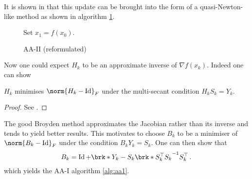 %


It is shown in \cite{ZhaAA} that this update can be brought into the form of a quasi-Newton-like method as shown in algorithm \ref{alg:aa2-ref}.

\begin{figure}
\begin{algorithm}[H]
\caption{AA-II (reformulated)}
\label{alg:aa2-ref}

\BlankLine
{\black Set $x_1 =f(x_0)$.}

\end{algorithm}
\end{figure}

Now one could expect $H_k$ to be an approximate inverse of $\nabla f(x_k)$. Indeed one can show
\begin{proposition}
	$H_k$ minimises $\norm{H_k-\Id}_F$ under the multi-secant condition $H_kS_k=Y_k$.
\end{proposition}
\begin{proof}
	See \cite{ZhaAA}.
\end{proof}
The good Broyden method approximates the Jacobian rather than its inverse and tends to yield better results. This motivates to choose  $B_k$ to be a minimiser of $\norm{B_k-\Id}_F$ under the condition $B_kY_k=S_k$.
One can then show that
\begin{align*}
	B_k = \Id+\brk*{Y_k-S_k}\brk*{S_k^\top S_k}^{-1}S_k^\top\,.
\end{align*}
which yields the AA-I algorithm \ref{alg:aa1}.

